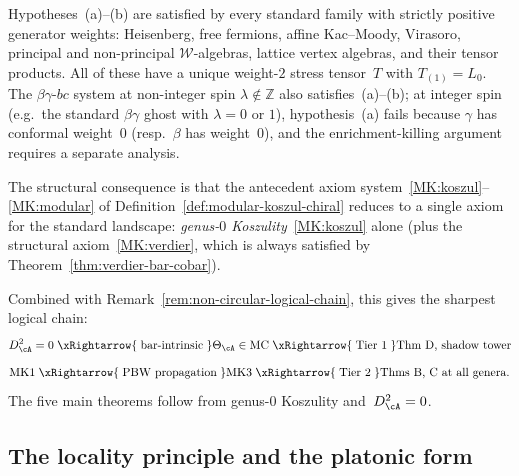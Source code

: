\begin{remark}
\label{rem:pbw-propagation-scope}

Hypotheses~(a)--(b) are satisfied by every standard
family with strictly positive generator weights:
Heisenberg, free fermions,
affine Kac--Moody, Virasoro, principal and non-principal
$\mathcal{W}$-algebras, lattice vertex algebras, and
their tensor products.  All of these have a unique
weight-$2$ stress tensor~$T$ with $T_{(1)} = L_0$.
The $\beta\gamma$-$bc$ system at non-integer spin
$\lambda \notin \mathbb{Z}$ also satisfies~(a)--(b);
at integer spin \textup{(}e.g.\ the standard
$\beta\gamma$ ghost with $\lambda = 0$ or $1$\textup{)},
hypothesis~(a) fails because $\gamma$ has conformal weight~$0$
\textup{(}resp.\ $\beta$ has weight~$0$\textup{)}, and the
enrichment-killing argument requires a separate analysis.

The structural consequence is that the antecedent axiom
system~\ref{MK:koszul}--\ref{MK:modular} of
Definition~\ref{def:modular-koszul-chiral}
reduces to a single axiom for the standard landscape:
\emph{genus-$0$ Koszulity}~\ref{MK:koszul} alone
(plus the structural axiom~\ref{MK:verdier},
which is always satisfied by
Theorem~\ref{thm:verdier-bar-cobar}).

Combined with
Remark~\ref{rem:non-circular-logical-chain}, this gives
the sharpest logical chain:
\[
D_\cA^2 = 0
\;\xRightarrow{\;\text{bar-intrinsic}\;}
\Theta_\cA \in \mathrm{MC}
\;\xRightarrow{\;\text{Tier~1}\;}
\text{Thm D, shadow tower}
\]
\[
\text{MK1}
\;\xRightarrow{\;\text{PBW propagation}\;}
\text{MK3}
\;\xRightarrow{\;\text{Tier~2}\;}
\text{Thms B, C at all genera.}
\]
The five main theorems follow from genus-$0$ Koszulity
and~$D_\cA^2 = 0$.
\end{remark}

\subsection{The locality principle and the platonic form}
\label{subsec:locality-platonic}

